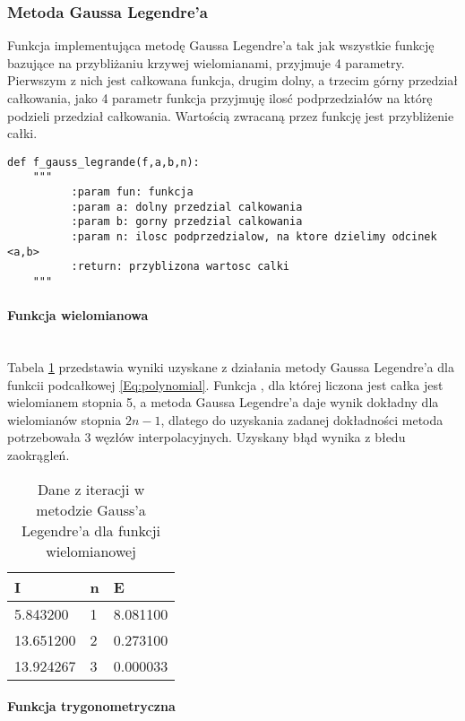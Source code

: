 \documentclass[12pt,twoside]{article}
\begin{document}
\subsubsection{Metoda Gaussa Legendre'a}
Funkcja implementująca metodę Gaussa Legendre'a tak jak wszystkie funkcję bazujące na przybliżaniu krzywej wielomianami, przyjmuje 4 parametry. Pierwszym z nich jest całkowana funkcja, drugim dolny, a trzecim górny przedział całkowania, jako 4 parametr funkcja przyjmuję ilosć podprzedziałów na którę podzieli przedział całkowania. Wartością zwracaną przez funkcję jest przybliżenie całki.

\begin{lstlisting}[caption={Kod w języku python implementujący metodę Gaussa Legendre'a}]
def f_gauss_legrande(f,a,b,n):
    """
          :param fun: funkcja
          :param a: dolny przedzial calkowania
          :param b: gorny przedzial calkowania
          :param n: ilosc podprzedzialow, na ktore dzielimy odcinek <a,b>
          :return: przyblizona wartosc calki
    """
\end{lstlisting}
\label{Listing 9}

\paragraph{Funkcja wielomianowa}\mbox{} \\

Tabela \ref{tabela4.1} przedstawia wyniki uzyskane z działania metody Gaussa Legendre'a dla funkcii podcałkowej \eqref{Eq:polynomial}. Funkcja , dla której liczona jest całka jest wielomianem stopnia 5, a metoda Gaussa Legendre'a daje wynik dokładny dla wielomianów stopnia $2n-1$, dlatego do uzyskania zadanej dokładności metoda potrzebowała 3 węzłów interpolacyjnych. Uzyskany błąd wynika z błedu zaokrągleń.

\begin{table}[H]
\centering 
\caption{Dane z iteracji w metodzie Gauss'a Legendre'a dla funkcji wielomianowej}
\label{tabela4.1}
\begin{tabular}{lll}
\toprule
I &  n &      E \\
\midrule
5.843200 &       1 & 8.081100 \\
13.651200 &       2 & 0.273100 \\
13.924267 &       3 & 0.000033 \\
\bottomrule
\end{tabular}
\end{table}

\paragraph{Funkcja trygonometryczna}\mbox{} \\
\end{document}
